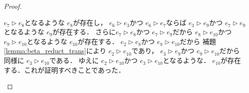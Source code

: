 \documentclass{ltjsbook}%
\newcommand\lemmaname{補題}%
\begin{document}
\begin{proof}
\begin{itemize}
    $\mathit{e}_7^{}\triangleright\mathit{e}_8^{}$となるような%
    $\mathit{e}_8^{}$が存在し，%
    $\mathit{e}_6^{}\triangleright\mathit{e}_3^{}$かつ%
    $\mathit{e}_6^{}\triangleright\mathit{e}_7^{}$ならば%
    $\mathit{e}_3^{}\triangleright\mathit{e}_9^{}$かつ%
    $\mathit{e}_7^{}\triangleright\mathit{e}_9^{}$となるような%
    $\mathit{e}_9^{}$が存在する．%
    さらに$\mathit{e}_7^{}\triangleright\mathit{e}_8^{}$かつ%
    $\mathit{e}_7^{}\triangleright\mathit{e}_9^{}$だから%
    $\mathit{e}_8^{}\triangleright\mathit{e}_{10}^{}$かつ%
    $\mathit{e}_9^{}\triangleright\mathit{e}_{10}^{}$となるような%
    $\mathit{e}_{10}^{}$が存在する．%
    $\mathit{e}_2^{}\triangleright\mathit{e}_8^{}$かつ%
    $\mathit{e}_8^{}\triangleright\mathit{e}_{10}^{}$だから%
    \lemmaname\ref{lemma:beta_reduct_trans}により%
    $\mathit{e}_2^{}\triangleright\mathit{e}_{10}^{}$であり，%
    $\mathit{e}_3^{}\triangleright\mathit{e}_9^{}$かつ%
    $\mathit{e}_9^{}\triangleright\mathit{e}_{10}^{}$だから%
    同様に%
    $\mathit{e}_3^{}\triangleright\mathit{e}_{10}^{}$である．%
    ゆえに%
    $\mathit{e}_2^{}\triangleright\mathit{e}_{10}^{}$かつ%
    $\mathit{e}_3^{}\triangleright\mathit{e}_{10}^{}$となるような．%
    $\mathit{e}_{10}^{}$が存在する．これが証明すべきことであった．%
  \end{itemize}%
\end{proof}%
\backmatter%
\end{document}
